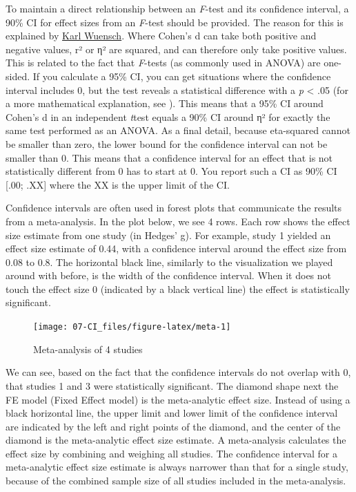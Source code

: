 \documentclass[
]{krantz}
\begin{document}
To maintain a direct relationship between an \emph{F}-test and its confidence interval, a 90\% CI for effect sizes from an \emph{F}-test should be provided. The reason for this is explained by \href{http://core.ecu.edu/psyc/wuenschk/docs30/CI-Eta2-Alpha.doc}{Karl Wuensch}. Where Cohen's d can take both positive and negative values, r² or η² are squared, and can therefore only take positive values. This is related to the fact that \emph{F}-tests (as commonly used in ANOVA) are one-sided. If you calculate a 95\% CI, you can get situations where the confidence interval includes 0, but the test reveals a statistical difference with a \emph{p} \textless{} .05 (for a more mathematical explanation, see \citet{steiger_beyond_2004}). This means that a 95\% CI around Cohen's d in an independent \emph{t}test equals a 90\% CI around η² for exactly the same test performed as an ANOVA. As a final detail, because eta-squared cannot be smaller than zero, the lower bound for the confidence interval can not be smaller than 0. This means that a confidence interval for an effect that is not statistically different from 0 has to start at 0. You report such a CI as 90\% CI {[}.00; .XX{]} where the XX is the upper limit of the CI.

Confidence intervals are often used in forest plots that communicate the results from a meta-analysis. In the plot below, we see 4 rows. Each row shows the effect size estimate from one study (in Hedges' g). For example, study 1 yielded an effect size estimate of 0.44, with a confidence interval around the effect size from 0.08 to 0.8. The horizontal black line, similarly to the visualization we played around with before, is the width of the confidence interval. When it does not touch the effect size 0 (indicated by a black vertical line) the effect is statistically significant.

\begin{figure}

{\centering \texttt{[image: 07-CI\_files/figure-latex/meta-1]} 

}

\caption{Meta-analysis of 4 studies}\label{fig:meta}
\end{figure}

We can see, based on the fact that the confidence intervals do not overlap with 0, that studies 1 and 3 were statistically significant. The diamond shape next the FE model (Fixed Effect model) is the meta-analytic effect size. Instead of using a black horizontal line, the upper limit and lower limit of the confidence interval are indicated by the left and right points of the diamond, and the center of the diamond is the meta-analytic effect size estimate. A meta-analysis calculates the effect size by combining and weighing all studies. The confidence interval for a meta-analytic effect size estimate is always narrower than that for a single study, because of the combined sample size of all studies included in the meta-analysis.
\end{document}
